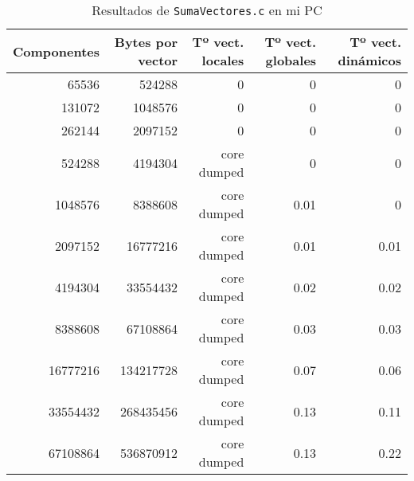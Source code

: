 \begin{center}
\begin{table}[!h]
\begin{tabular}{r r r r r}
\textbf{Componentes} & \textbf{Bytes por vector} & \textbf{Tº vect. locales} & \textbf{Tº vect. globales} & \textbf{Tº vect. dinámicos} \\
\toprule
65536                   & 524288                      & 0                         & 0                          & 0                           \\
131072                  & 1048576                     & 0                         & 0                          & 0                           \\
262144                  & 2097152                     & 0                         & 0                          & 0                           \\
524288                  & 4194304                     & core dumped               & 0                          & 0                           \\
1048576                 & 8388608                     & core dumped               & 0.01                       & 0                           \\
2097152                 & 16777216                    & core dumped               & 0.01                       & 0.01                        \\
4194304                 & 33554432                    & core dumped               & 0.02                       & 0.02                        \\
8388608                 & 67108864                    & core dumped               & 0.03                       & 0.03                        \\
16777216                & 134217728                   & core dumped               & 0.07                       & 0.06                        \\
33554432                & 268435456                   & core dumped               & 0.13                       & 0.11                        \\
67108864                & 536870912                   & core dumped               & 0.13                       & 0.22                        \\
\end{tabular}
\caption{Resultados de \texttt{SumaVectores.c} en mi PC}
\end{table}


\end{center}
